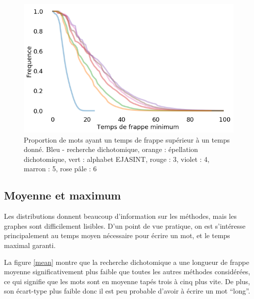 \documentclass[twoside,twocolumn]{article}
\begin{document}
\begin{center}
\begin{figure}
  \includegraphics[scale=0.35]{frappe-mini.png}
  \caption{Proportion de mots ayant un temps de frappe supérieur à un temps donné. Bleu - recherche dichotomique, orange : épellation dichotomique, vert : alphabet EJASINT, rouge : 3, violet : 4, marron : 5, rose pâle : 6}
  \label{frappe-mini}
\end{figure}
\end{center}

\subsection{Moyenne et maximum}

Les distributions donnent beaucoup d'information sur les méthodes, mais les graphes sont difficilement lisibles. D'un point de vue pratique, on est s'intéresse principalement au temps moyen nécessaire pour écrire un mot, et le temps maximal garanti.

La figure \ref{mean} montre que la recherche dichotomique a une longueur de frappe moyenne significativement plus faible que toutes les autres méthodes considérées, ce qui signifie que les mots sont en moyenne tapés trois à cinq plus vite. De plus, son écart-type plus faible donc il est peu probable d'avoir à écrire un mot ``long''.
\end{document}
